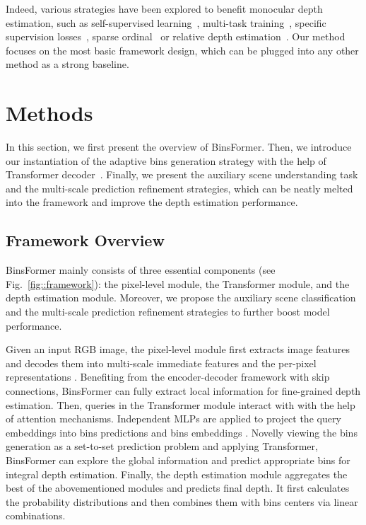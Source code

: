 \documentclass[runningheads]{llncs}
\begin{document}
Indeed, various strategies have been explored to benefit monocular depth estimation, such as self-supervised learning~\cite{godard2019digging}, multi-task training~\cite{jung2021fine}, specific supervision losses~\cite{wang2020cliffnet}, sparse ordinal~\cite{lo2021depth} or relative depth estimation~\cite{lee2019monocular}. Our method focuses on the most basic framework design, which can be plugged into any other method as a strong baseline.
 \section{Methods} 

In this section, we first present the overview of BinsFormer. Then, we introduce our instantiation of the adaptive bins generation strategy with the help of Transformer decoder~\cite{carion2020detr}. Finally, we present the auxiliary scene understanding task and the multi-scale prediction refinement strategies, which can be neatly melted into the framework and improve the depth estimation performance.

\subsection{Framework Overview}

BinsFormer mainly consists of three essential components (see Fig.~\ref{fig::framework}): the pixel-level module, the Transformer module, and the depth estimation module. Moreover, we propose the auxiliary scene classification and the multi-scale prediction refinement strategies to further boost model performance.

Given an input RGB image, the pixel-level module first extracts image features and decodes them into multi-scale immediate features  and the per-pixel representations . Benefiting from the encoder-decoder framework with skip connections, BinsFormer can fully extract local information for fine-grained depth estimation. Then, queries in the Transformer module interact with  with the help of attention mechanisms. Independent MLPs are applied to project the query embeddings into bins predictions  and bins embeddings . Novelly viewing the bins generation as a set-to-set prediction problem and applying Transformer, BinsFormer can explore the global information and predict appropriate bins for integral depth estimation. Finally, the depth estimation module aggregates the best of the abovementioned modules and predicts final depth. It first calculates the probability distributions  and then combines them with bins centers  via linear combinations.
\end{document}
